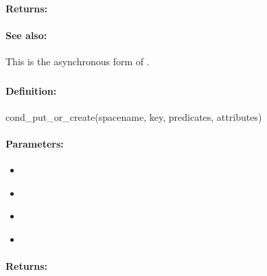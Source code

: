 \paragraph{Returns:}


\paragraph{See also:}  This is the asynchronous form of .

\pagebreak
\subsubsection{}
\label{api:ruby:cond_put_or_create}


\paragraph{Definition:}
\begin{rubycode}
cond_put_or_create(spacename, key, predicates, attributes)
\end{rubycode}

\paragraph{Parameters:}
\begin{itemize}[noitemsep]
\item {}\\

\item {}\\

\item {}\\

\item {}\\

\end{itemize}

\paragraph{Returns:}


